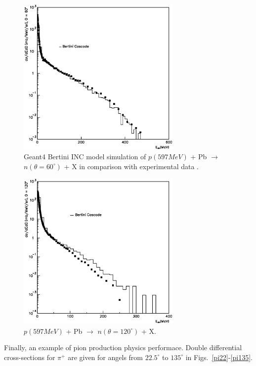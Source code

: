 \documentclass[twocolumn,twoside,slac]{revtex4}
\begin{document}
\begin{figure}
  \includegraphics[width=80mm,keepaspectratio]{pn_pb_597_n_a1.eps}
  \caption{Geant4 Bertini INC model simulation of 
$p(597 MeV)$ + Pb $\rightarrow$ $n(\theta = 60^{\circ})$ + X 
in comparison with experimental data \cite{benchmarkData02}.}
  \label{pbn60}
\end{figure}


\begin{figure}
  \includegraphics[width=80mm,keepaspectratio]{pn_pb_597_n_a3.eps}
  \caption{$p(597 MeV)$ + Pb $\rightarrow$ $n(\theta = 120^{\circ})$ + X.}
  \label{pbn120}
\end{figure}




Finally, an example of pion production physics performace.
Double differential cross-sections for $\pi^{+}$ are given for
angels from $22.5^{\circ}$ to $135^{\circ}$ in Figs.~\ref{pi22}-\ref{pi135}.
\end{document}
